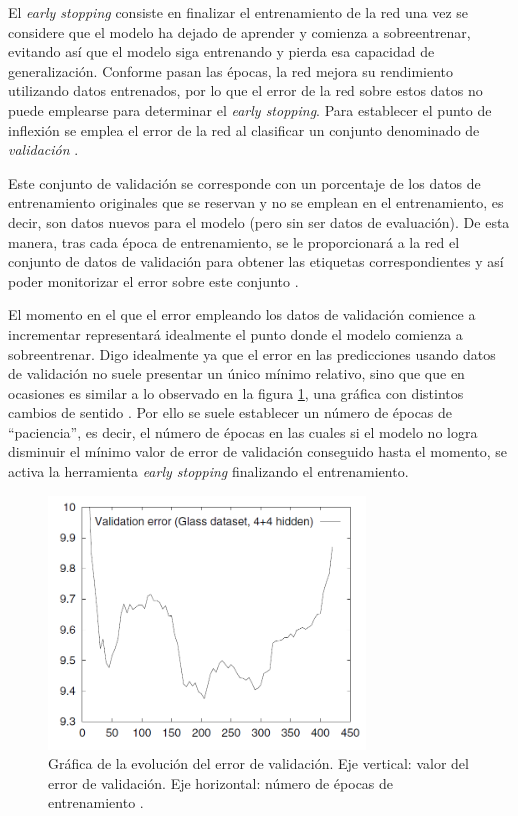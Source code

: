 El \textit{early stopping} consiste en finalizar el entrenamiento de la red una vez se considere que el modelo ha dejado de aprender y comienza a sobreentrenar, evitando así que el modelo siga entrenando y pierda esa capacidad de generalización. Conforme pasan las épocas, la red mejora su rendimiento utilizando datos entrenados, por lo que el error de la red sobre estos datos no puede emplearse para determinar el \textit{early stopping}. Para establecer el punto de inflexión se emplea el error de la red al clasificar un conjunto denominado de \textit{validación} \cite{early:butwhen}.

Este conjunto de validación se corresponde con un porcentaje de los datos de entrenamiento originales que se reservan y no se emplean en el entrenamiento, es decir, son datos nuevos para el modelo (pero sin ser datos de evaluación). De esta manera, tras cada época de entrenamiento, se le proporcionará a la red el conjunto de datos de validación para obtener las etiquetas correspondientes y así poder monitorizar el error sobre este conjunto \cite{early:overview}. 

El momento en el que el error empleando los datos de validación comience a incrementar representará idealmente el punto donde el modelo comienza a sobreentrenar. Digo idealmente ya que el error en las predicciones usando datos de validación no suele presentar un único mínimo relativo, sino que que en ocasiones es similar a lo observado en la figura \ref{fig:validacion}, una gráfica con distintos cambios de sentido \cite{early:butwhen}. Por ello se suele establecer un número de épocas de ``paciencia'', es decir, el número de épocas en las cuales si el modelo no logra disminuir el mínimo valor de error de validación conseguido hasta el momento, se activa la herramienta \textit{early stopping} finalizando el entrenamiento.

\begin{figure}[h]
    \centering
    \includegraphics[width=0.75\textwidth]{img/validacion error.png}
    \caption{Gráfica de la evolución del error de validación. Eje vertical: valor del error de validación. Eje horizontal: número de épocas de entrenamiento \cite{early:butwhen}.}
    \label{fig:validacion}
\end{figure}

